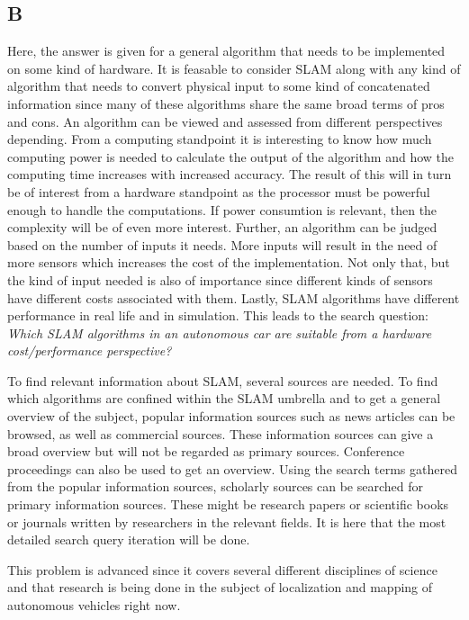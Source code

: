 \documentclass[a4paper, 12pt]{article}
\begin{document}
\subsection*{B}
Here, the answer is given for a general algorithm that needs to be implemented on some
kind of hardware. It is feasable to consider SLAM along with any kind of algorithm that
needs to convert physical input to some kind of concatenated information since 
many of these algorithms share the same broad terms of pros and cons. 
An algorithm can be viewed and assessed from different perspectives depending. 
From a computing standpoint it is interesting to know how much computing power is 
needed to calculate the output of the algorithm and how the computing time increases
with increased accuracy. The result of this will in turn be of interest from a
hardware standpoint as the processor must be powerful enough to handle the computations.
If power consumtion is relevant, then the complexity will be of even more interest.
Further, an algorithm can be judged based on the number of inputs it needs. More
inputs will result in the need of more sensors which increases the cost of the 
implementation. Not only that, but the kind of input needed is also of importance 
since different kinds of sensors have different costs associated with them.
Lastly, SLAM algorithms have different performance in real life and in simulation.
This leads to the search question: \textit{Which SLAM algorithms in an autonomous car are 
suitable from a hardware cost/performance perspective?}

To find relevant information about SLAM, several sources are needed. To find 
which algorithms are confined within the SLAM umbrella and to get a general
overview of the subject, popular information sources such as news articles can 
be browsed, as well as commercial sources. These information sources can 
give a broad overview but will not be regarded as primary sources. Conference 
proceedings can also be used to get an overview. Using the search
terms gathered from the popular information sources, scholarly sources can be 
searched for primary information sources. These might be research papers or 
scientific books or journals written by researchers in the relevant fields. It 
is here that the most detailed search query iteration will be done. 

This problem is advanced since it covers several different disciplines of science
and that research is being done in the subject of localization and mapping of
autonomous vehicles right now. 
\end{document}
